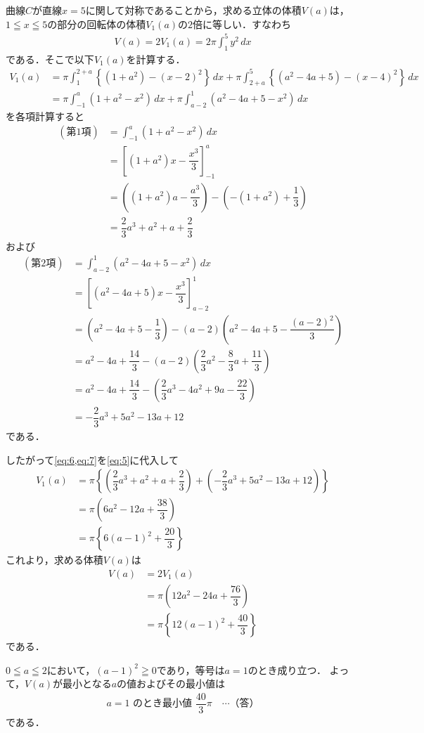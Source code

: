 \documentclass[../../main.tex]{subfiles}
\begin{document}
曲線$C$が直線$x=5$に関して対称であることから，求める立体の体積$V(a)$は，$1 \leqq x \leqq 5$の部分の回転体の体積$V_1(a)$の$2$倍に等しい．すなわち
\begin{align}
  V(a) = 2V_1(a) = 2\pi \int_1^5 y^2 \, dx \label{eq:4}
\end{align}
である．そこで以下$V_1(a)$を計算する．
\begin{align}
  V_1(a)
  &= \pi \int_1^{2+a} \left\{(1+a^2)-(x-2)^2\right\} \, dx + \pi \int_{2+a}^5 \left\{(a^2-4a+5)-(x-4)^2\right\} \, dx \\
  &= \pi \int_{-1}^a (1+a^2-x^2) \, dx + \pi \int_{a-2}^1 (a^2-4a+5-x^2) \, dx \label{eq:5}
\end{align}
を各項計算すると
\begin{align}
  (\text{第1項})
  &= \int_{-1}^a (1+a^2-x^2) \, dx \nonumber\\
  &= \left[ (1+a^2)x - \dfrac{x^3}{3} \right]_{-1}^a \nonumber\\
  &= \left( (1+a^2)a-\dfrac{a^3}{3} \right) - \left( -(1+a^2)+\dfrac{1}{3} \right) \nonumber\\
  &= \dfrac{2}{3}a^3 + a^2 + a + \dfrac{2}{3} \label{eq:6}
\end{align}
および
\begin{align}
  (\text{第2項})
  &= \int_{a-2}^1 (a^2-4a+5-x^2) \, dx \nonumber\\
  &= \left[ (a^2-4a+5)x - \dfrac{x^3}{3} \right]_{a-2}^1 \nonumber\\
  &= \left( a^2-4a+5-\dfrac{1}{3} \right) - (a-2)\left( a^2-4a+5 - \dfrac{(a-2)^2}{3} \right) \nonumber\\
  &= a^2-4a+\dfrac{14}{3} - (a-2)\left( \dfrac{2}{3}a^2 - \dfrac{8}{3}a + \dfrac{11}{3} \right) \nonumber\\
  &= a^2-4a+\dfrac{14}{3} - \left( \dfrac{2}{3}a^3 - 4a^2 + 9a - \dfrac{22}{3} \right) \nonumber\\
  &= -\dfrac{2}{3}a^3 + 5a^2 - 13a + 12 \label{eq:7}
\end{align}
である．

したがって\cref{eq:6,eq:7}を\cref{eq:5}に代入して
\begin{align}
  V_1(a) &= \pi \left\{ \left( \dfrac{2}{3}a^3 + a^2 + a + \dfrac{2}{3} \right) + \left( -\dfrac{2}{3}a^3 + 5a^2 - 13a + 12 \right) \right\} \nonumber\\
  &= \pi \left( 6a^2 - 12a + \dfrac{38}{3} \right) \nonumber\\
  &= \pi \left\{ 6(a-1)^2 + \dfrac{20}{3} \right\}
\end{align}
これより，求める体積$V(a)$は
\begin{align}
  V(a) &= 2V_1(a) \nonumber\\
  &= \pi \left( 12a^2 - 24a + \dfrac{76}{3} \right) \nonumber\\
  &= \pi \left\{ 12(a-1)^2 + \dfrac{40}{3} \right\}
\end{align}
である．

$0 \leqq a \leqq 2$において，$(a-1)^2 \geqq 0$であり，等号は$a=1$のとき成り立つ．
よって，$V(a)$が最小となる$a$の値およびその最小値は
\begin{align}
  a=1 \text{ のとき最小値 } \dfrac{40}{3}\pi \quad \cdots\text{（答）}
\end{align}
である．
\end{document}
